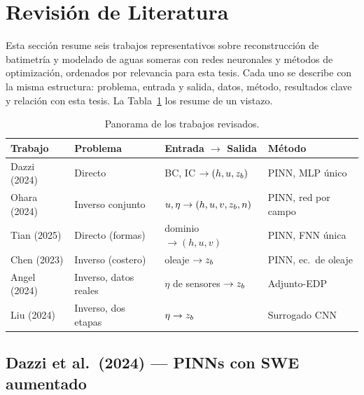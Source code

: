 \section{Revisión de Literatura}
\label{sec:lit}

Esta sección resume seis trabajos representativos sobre reconstrucción de
batimetría y modelado de aguas someras con redes neuronales y métodos de
optimización, ordenados por relevancia para esta tesis. Cada uno se describe con
la misma estructura: problema, entrada y salida, datos, método, resultados clave
y relación con esta tesis. La Tabla~\ref{tab:lit-overview} los resume de un
vistazo.


\begin{table}[H]
\centering
\caption{Panorama de los trabajos revisados.}
\label{tab:lit-overview}
\begin{tabular}{@{}llll@{}}
\toprule
Trabajo & Problema & Entrada $\to$ Salida & Método \\
\midrule
Dazzi (2024) & Directo               & BC, IC $\to (h,u,z_b)$      & PINN, MLP único \\
Ohara (2024) & Inverso conjunto      & $u,\eta \to (h,u,v,z_b,n)$  & PINN, red por campo \\
Tian (2025)  & Directo (formas)      & dominio $\to (h,u,v)$       & PINN, FNN única \\
Chen (2023)  & Inverso (costero)     & oleaje $\to z_b$            & PINN, ec.\ de oleaje \\
Angel (2024) & Inverso, datos reales & $\eta$ de sensores $\to z_b$ & Adjunto-EDP \\
Liu (2024)   & Inverso, dos etapas   & $\eta \to z_b$              & Surrogado CNN \\
\bottomrule
\end{tabular}
\end{table}

\subsection{Dazzi et al.\ (2024) --- PINNs con SWE aumentado}
\label{sec:lit:dazzi}

